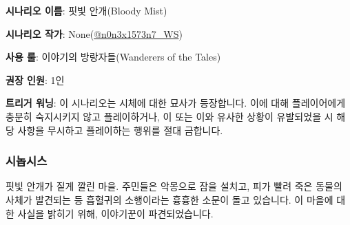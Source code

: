 \documentclass{report}
\begin{document}
	\textbf{시나리오 이름}: 핏빛 안개(Bloody Mist)
	
	\textbf{시나리오 작가}: None(\href{https://www.twitter.com/n0n3x1573n7_WS}{@n0n3x1573n7\_WS})
	
	\textbf{사용 룰}: 이야기의 방랑자들(Wanderers of the Tales)
	
	\textbf{권장 인원}: 1인
	
	\textbf{트리거 워닝}: 이 시나리오는 시체에 대한 묘사가 등장합니다. 이에 대해 플레이어에게 충분히 숙지시키지 않고 플레이하거나, 이 또는 이와 유사한 상황이 유발되었을 시 해당 사항을 무시하고 플레이하는 행위를 절대 금합니다.
	
	\subsubsection*{시놉시스}
	핏빛 안개가 짙게 깔린 마을. 주민들은 악몽으로 잠을 설치고, 피가 빨려 죽은 동물의 사체가 발견되는 등 흡혈귀의 소행이라는 흉흉한 소문이 돌고 있습니다. 이 마을에 대한 사실을 밝히기 위해, 이야기꾼이 파견되었습니다.
\end{document}

